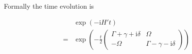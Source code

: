 \documentclass[10pt,fleqn]{article}
\newcommand{\ue}{\mathrm{e}}
\newcommand{\ui}{\mathrm{i}}
\newcommand{\eqar}[1]
{
  \begin{align*}
    #1
  \end{align*}
}
\newcommand{\paren}[1]{{\left({#1}\right)}}
\begin{document}
Formally the time evolution is
\eqar{
  &\exp\paren{-\ui H't}\\
  =&\exp\paren{-\frac t2\begin{pmatrix}
      \Gamma+\gamma+\ui\delta&\Omega\\
      -\Omega&\Gamma-\gamma-\ui\delta
    \end{pmatrix}}
}
\end{document}
